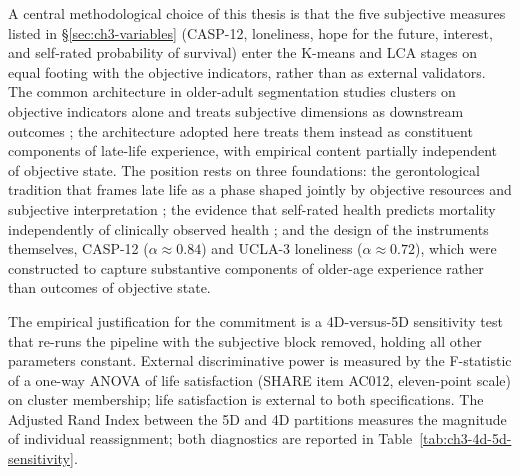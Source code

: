 A central methodological choice of this thesis is that the five subjective measures listed in \S\ref{sec:ch3-variables} (CASP-12, loneliness, hope for the future, interest, and self-rated probability of survival) enter the K-means and LCA stages on equal footing with the objective indicators, rather than as external validators. The common architecture in older-adult segmentation studies clusters on objective indicators alone and treats subjective dimensions as downstream outcomes \citep{wahrendorfsiegrist2010}; the architecture adopted here treats them instead as constituent components of late-life experience, with empirical content partially independent of objective state. The position rests on three foundations: the gerontological tradition that frames late life as a phase shaped jointly by objective resources and subjective interpretation \citep{lalivedepinay2005}; the evidence that self-rated health predicts mortality independently of clinically observed health \citep{idlerbenyamini1997}; and the design of the instruments themselves, CASP-12 \citep{hyde2003} ($\alpha \approx 0.84$) and UCLA-3 loneliness \citep{hughes2004} ($\alpha \approx 0.72$), which were constructed to capture substantive components of older-age experience rather than outcomes of objective state.

\label{sec:ch3-subjective-empirical}
The empirical justification for the commitment is a 4D-versus-5D sensitivity test that re-runs the pipeline with the subjective block removed, holding all other parameters constant. External discriminative power is measured by the F-statistic of a one-way ANOVA of life satisfaction (SHARE item AC012, eleven-point scale) on cluster membership; life satisfaction is external to both specifications. The Adjusted Rand Index between the 5D and 4D partitions measures the magnitude of individual reassignment; both diagnostics are reported in Table~\ref{tab:ch3-4d-5d-sensitivity}.

